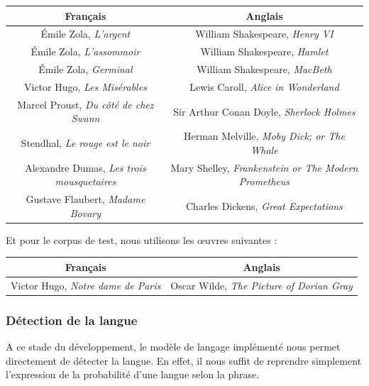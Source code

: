 \documentclass[10pt,a4paper]{article}
\begin{document}
\bgroup
\def\arraystretch{1.5}
\begin{center}
\begin{tabular}{ | c | c | }
 \hline                 
   Français & Anglais \\ \hline
   Émile Zola, \textit{L'argent} & William Shakespeare, \textit{Henry VI} \\ 
   Émile Zola, \textit{L'assommoir} & William Shakespeare, \textit{Hamlet} \\
   Émile Zola, \textit{Germinal} & William Shakespeare, \textit{MacBeth} \\
   Victor Hugo, \textit{Les Misérables} & Lewis Caroll, \textit{Alice in Wonderland} \\
   Marcel Proust, \textit{Du côté de chez Swann} & Sir Arthur Conan Doyle, \textit{Sherlock Holmes} \\
   Stendhal, \textit{Le rouge est le noir} & Herman Melville, \textit{Moby Dick; or The Whale} \\
   Alexandre Dumas, \textit{Les trois mousquetaires} & Mary Shelley, \textit{Frankenstein or The Modern Prometheus} \\
   Gustave Flaubert, \textit{Madame Bovary} & Charles Dickens, \textit{Great Expectations} \\
 \hline  
 \end{tabular}
 \end{center}
 \egroup

Et pour le corpus de test, nous utilisons les œuvres suivantes : 

\bgroup
\def\arraystretch{1.5}
\begin{center}
\begin{tabular}{ | c | c | }
 \hline                 
   Français & Anglais \\ \hline
   Victor Hugo, \textit{Notre dame de Paris} & Oscar Wilde, \textit{The Picture of Dorian Gray} \\ 
 \hline  
 \end{tabular}
 \end{center}
 \egroup
 
 \subsubsection{Détection de la langue}
 
 A ce stade du développement, le modèle de langage implémenté nous permet directement de détecter la langue.
 En effet, il nous suffit de reprendre simplement l'expression de la probabilité d'une langue selon la phrase.
 
\end{document}

